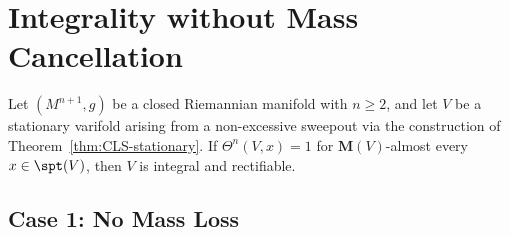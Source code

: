 \section{Integrality without Mass Cancellation}\label{sec:integrality}

\begin{theorem}\label{thm:integrality-mult-one}
    Let $(M^{n+1},g)$ be a closed Riemannian manifold with $n \geq 2$, and let $V$ be a
    stationary varifold arising from a non-excessive sweepout via the construction of
    Theorem~\ref{thm:CLS-stationary}. If $\Theta^n(V,x)=1$ for $\mathbf{M}(V)$-almost every
    $x\in\spt(V)$, then $V$ is integral and rectifiable.
\end{theorem}

\subsection{Case 1: No Mass Loss}

